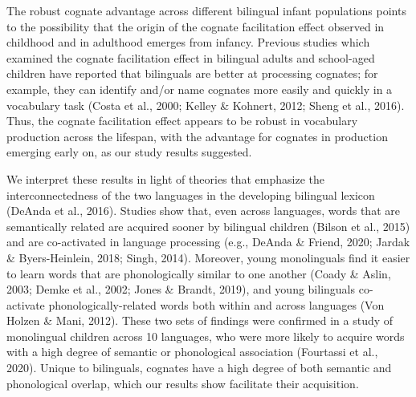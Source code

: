 \documentclass[
  ,man,floatsintext]{apa6}
\begin{document}
The robust cognate advantage across different bilingual infant populations points to the possibility that the origin of the cognate facilitation effect observed in childhood and in adulthood emerges from infancy. Previous studies which examined the cognate facilitation effect in bilingual adults and school-aged children have reported that bilinguals are better at processing cognates; for example, they can identify and/or name cognates more easily and quickly in a vocabulary task (Costa et al., 2000; Kelley \& Kohnert, 2012; Sheng et al., 2016). Thus, the cognate facilitation effect appears to be robust in vocabulary production across the lifespan, with the advantage for cognates in production emerging early on, as our study results suggested.

We interpret these results in light of theories that emphasize the interconnectedness of the two languages in the developing bilingual lexicon (DeAnda et al., 2016). Studies show that, even across languages, words that are semantically related are acquired sooner by bilingual children (Bilson et al., 2015) and are co-activated in language processing (e.g., DeAnda \& Friend, 2020; Jardak \& Byers-Heinlein, 2018; Singh, 2014). Moreover, young monolinguals find it easier to learn words that are phonologically similar to one another (Coady \& Aslin, 2003; Demke et al., 2002; Jones \& Brandt, 2019), and young bilinguals co-activate phonologically-related words both within and across languages (Von Holzen \& Mani, 2012). These two sets of findings were confirmed in a study of monolingual children across 10 languages, who were more likely to acquire words with a high degree of semantic or phonological association (Fourtassi et al., 2020). Unique to bilinguals, cognates have a high degree of both semantic and phonological overlap, which our results show facilitate their acquisition.
\end{document}
